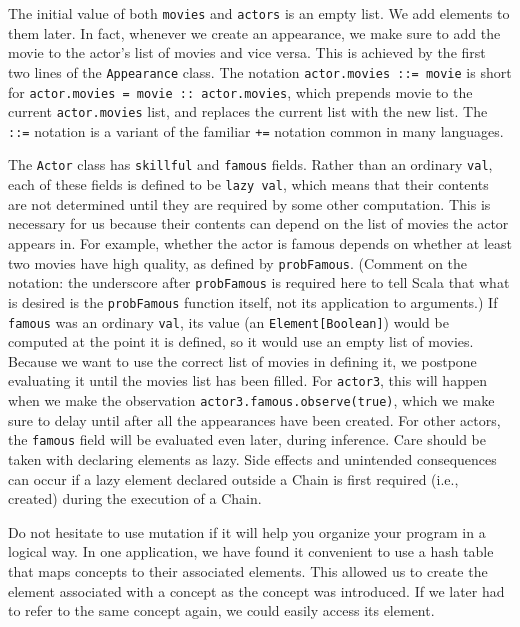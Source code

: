 The initial value of both \texttt{movies} and \texttt{actors} is an empty list. We add elements to them later. In fact, whenever we create an appearance, we make sure to add the movie to the actor's list of movies and vice versa. This is achieved by the first two lines of the \texttt{Appearance} class. The notation \texttt{actor.movies ::= movie} is short for \texttt{actor.movies = movie :: actor.movies}, which prepends movie to the current \texttt{actor.movies} list, and replaces the current list with the new list. The \texttt{::=} notation is a variant of the familiar \texttt{+=} notation common in many languages.

The \texttt{Actor} class has \texttt{skillful} and \texttt{famous} fields. Rather than an ordinary \texttt{val}, each of these fields is defined to be \texttt{lazy val}, which means that their contents are not determined until they are required by some other computation. This is necessary for us because their contents can depend on the list of movies the actor appears in. For example, whether the actor is famous depends on whether at least two movies have high quality, as defined by \texttt{probFamous}. (Comment on the notation: the underscore after \texttt{probFamous} is required here to tell Scala that what is desired is the \texttt{probFamous} function itself, not its application to arguments.)   If \texttt{famous} was an ordinary \texttt{val}, its value (an \texttt{Element[Boolean]}) would be computed at the point it is defined, so it would use an empty list of movies. Because we want to use the correct list of movies in defining it, we postpone evaluating it until the movies list has been filled. For \texttt{actor3}, this will happen when we make the observation \texttt{actor3.famous.observe(true)}, which we make sure to delay until after all the appearances have been created. For other actors, the \texttt{famous} field will be evaluated even later, during inference. Care should be taken with declaring elements as lazy. Side effects and unintended consequences can occur if a lazy element declared outside a Chain is first required (i.e., created) during the execution of a Chain.

Do not hesitate to use mutation if it will help you organize your program in a logical way. In one application, we have found it convenient to use a hash table that maps concepts to their associated elements. This allowed us to create the element associated with a concept as the concept was introduced. If we later had to refer to the same concept again, we could easily access its element.

